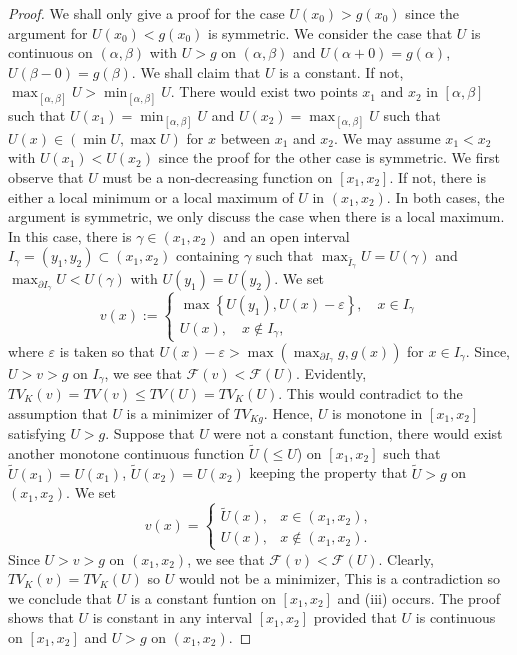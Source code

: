 \documentclass[11pt]{amsart} %
\numberwithin{equation}{section}
\begin{document}
\begin{proof}
We shall only give a proof for the case $U(x_0)>g(x_0)$ since the argument for $U(x_0)<g(x_0)$ is symmetric.
 We consider the case that $U$ is continuous on $(\alpha,\beta)$ with $U>g$ on $(\alpha,\beta)$ and $U(\alpha+0)=g(\alpha)$, $U(\beta-0)=g(\beta)$.
 We shall claim that $U$ is a constant.
 If not, $\max_{[\alpha,\beta]}U>\min_{[\alpha,\beta]}U$.
 There would exist two points $x_1$ and $x_2$ in $[\alpha,\beta]$ such that $U(x_1)=\min_{[\alpha,\beta]}U$ and $U(x_2)=\max_{[\alpha,\beta]}U$ such that $U(x)\in(\min U,\max U)$ for $x$ between $x_1$ and $x_2$.
 We may assume $x_1<x_2$ with $U(x_1)<U(x_2)$ since the proof for the other case is symmetric.
 We first observe that $U$ must be a non-decreasing function on $[x_1,x_2]$.
 If not, there is either a local minimum or a local maximum of $U$ in $(x_1, x_2)$.
 In both cases, the argument is symmetric, we only discuss the case when there is a local maximum.
 In this case, there is $\gamma\in(x_1,x_2)$ and an open interval $I_\gamma=(y_1,y_2)\subset(x_1,x_2)$ containing $\gamma$ such that $\max_{\bar{I}_\gamma}U=U(\gamma)$ and $\max_{\partial I_\gamma}U<U(\gamma)$ with $U(y_1)=U(y_2)$.
 We set
\[
	v(x) := \left\{
\begin{array}{l}
	\max \left\{ U(y_1), U(x) - \varepsilon \right\}, \quad x \in I_\gamma \\
	U(x), \quad x \notin I_\gamma,
\end{array}
\right.
\]
where $\varepsilon$ is taken so that $U(x)-\varepsilon>\max\left(\max_{\partial I_\gamma}g, g(x)\right)$ for $x\in I_\gamma$.
 Since, $U>v>g$ on $I_\gamma$, we see that $\mathcal{F}(v)<\mathcal{F}(U)$.
 Evidently, $TV_K(v)=TV(v)\leq TV(U)=TV_K(U)$.
 This would contradict to the assumption that $U$ is a minimizer of $TV_{Kg}$.
 Hence, $U$ is monotone in $[x_1,x_2]$ satisfying $U>g$.
 Suppose that $U$ were not a constant function, there would exist another monotone continuous function $\tilde{U}$ ($\le U$) on $[x_1,x_2]$ such that $\tilde{U}(x_1)=U(x_1)$, $\tilde{U}(x_2)=U(x_2)$ keeping the property that $\tilde{U}>g$ on $(x_1,x_2)$.
 We set
\[
	v(x) = \left\{
\begin{array}{ll}
	\tilde{U}(x), & x \in (x_1, x_2), \\
	U(x), & x \notin (x_1, x_2).
\end{array}
\right.
\]
Since $U>v>g$ on $(x_1,x_2)$, we see that $\mathcal{F}(v)<\mathcal{F}(U)$.
 Clearly, $TV_K(v)=TV_K(U)$ so $U$ would not be a minimizer,
 This is a contradiction so we conclude that $U$ is a constant funtion on $[x_1,x_2]$ and (i\hspace{-1pt}i\hspace{-1pt}i) occurs.
 The proof shows that $U$ is constant in any interval $[x_1,x_2]$ provided that $U$ is continuous on $[x_1,x_2]$ and $U>g$ on $(x_1,x_2)$.


\end{proof}
\end{document}
